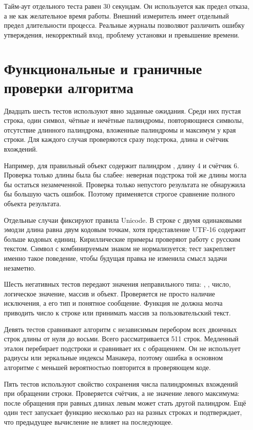 Тайм-аут отдельного теста равен 30 секундам. Он используется как предел отказа, а не как желательное время работы. Внешний измеритель имеет отдельный предел длительности процесса. Реальные журналы позволяют различить ошибку утверждения, некорректный вход, проблему установки и превышение времени.

\section{Функциональные и граничные проверки алгоритма}
Двадцать шесть тестов используют явно заданные ожидания. Среди них пустая строка, один символ, чётные и нечётные палиндромы, повторяющиеся символы, отсутствие длинного палиндрома, вложенные палиндромы и максимум у края строки. Для каждого случая проверяются сразу подстрока, длина и счётчик вхождений.

Например, для  правильный объект содержит палиндром , длину 4 и счётчик 6. Проверка только длины была бы слабее: неверная подстрока той же длины могла бы остаться незамеченной. Проверка только непустого результата не обнаружила бы большую часть ошибок. Поэтому применяется строгое сравнение полного объекта результата.

Отдельные случаи фиксируют правила Unicode. В строке с двумя одинаковыми эмодзи длина равна двум кодовым точкам, хотя представление UTF-16 содержит больше кодовых единиц. Кириллические примеры проверяют работу с русским текстом. Символ с комбинируемым знаком не нормализуется; тест закрепляет именно такое поведение, чтобы будущая правка не изменила смысл задачи незаметно.

Шесть негативных тестов передают значения неправильного типа: , , число, логическое значение, массив и объект. Проверяется не просто наличие исключения, а его тип и понятное сообщение. Функция не должна молча приводить число к строке или принимать массив за пользовательский текст.

Девять тестов сравнивают алгоритм с независимым перебором всех двоичных строк длины от нуля до восьми. Всего рассматривается 511 строк. Медленный эталон перебирает подстроки и сравнивает их с обращением. Он не использует радиусы или зеркальные индексы Манакера, поэтому ошибка в основном алгоритме с меньшей вероятностью повторится в проверяющем коде.

Пять тестов используют свойство сохранения числа палиндромных вхождений при обращении строки. Проверяется счётчик, а не значение левого максимума: после обращения при равных длинах левым может стать другой палиндром. Ещё один тест запускает функцию несколько раз на разных строках и подтверждает, что предыдущее вычисление не влияет на последующее.

